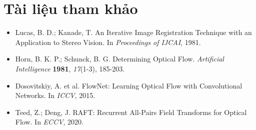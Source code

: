 \section*{Tài liệu tham khảo}
\begin{itemize}
    \item[1] Lucas, B. D.; Kanade, T. An Iterative Image Registration Technique with an Application to Stereo Vision. In \textit{Proceedings of IJCAI}, 1981.
    \item[2] Horn, B. K. P.; Schunck, B. G. Determining Optical Flow. \textit{Artificial Intelligence} \textbf{1981}, \textit{17}(1-3), 185-203.
    \item[3] Dosovitskiy, A. et al. FlowNet: Learning Optical Flow with Convolutional Networks. In \textit{ICCV}, 2015.
    \item[4] Teed, Z.; Deng, J. RAFT: Recurrent All-Pairs Field Transforms for Optical Flow. In \textit{ECCV}, 2020.
\end{itemize}
